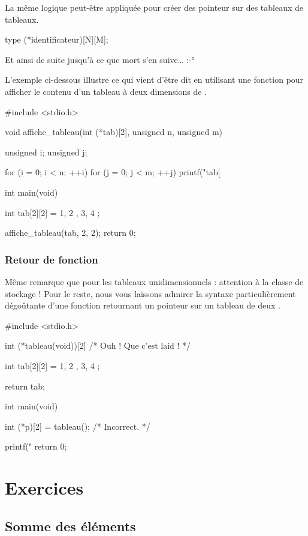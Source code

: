 La même logique peut-être appliquée pour créer des pointeur sur des
tableaux de tableaux.

\begin{C}
type (*identificateur)[N][M];
\end{C}

Et ainsi de suite jusqu'à ce que mort s'en suive\ldots{} :-°

L'exemple ci-dessous illustre ce qui vient d'être dit en utilisant une
fonction pour afficher le contenu d'un tableau à deux dimensions de
.

\begin{C}
#include <stdio.h>


void affiche_tableau(int (*tab)[2], unsigned n, unsigned m)
{
    unsigned i;
    unsigned j;

    for (i = 0; i < n; ++i)
        for (j = 0; j < m; ++j)
            printf("tab[%
}


int main(void)
{
    int tab[2][2] = { { 1, 2 }, { 3, 4 } };

    affiche_tableau(tab, 2, 2);
    return 0;
}
\end{C}

\subsubsection{Retour de fonction}
\label{retour-de-fonction-2}

Même remarque que pour les tableaux unidimensionnels : attention à la
classe de stockage ! Pour le reste, nous vous laissons admirer la
syntaxe particulièrement dégoûtante d'une fonction retournant un
pointeur sur un tableau de deux .

\begin{C}
 #include <stdio.h>


int (*tableau(void))[2] /* Ouh ! Que c'est laid ! */
{
    int tab[2][2] = { { 1, 2 }, { 3, 4 } };

    return tab;
}


int main(void)
{
    int (*p)[2] = tableau(); /* Incorrect. */

    printf("%
    return 0;
}
\end{C}

\section{Exercices}
\label{exercices-4}

\subsection{Somme des éléments}
\label{somme-des-elements}

